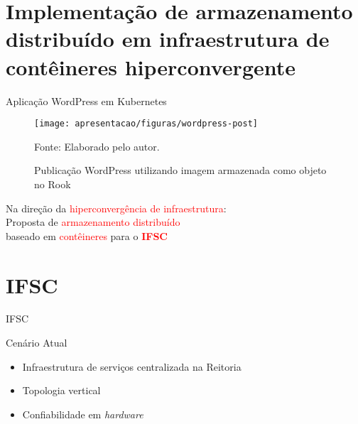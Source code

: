 \documentclass{beamer}
\begin{document}

\section{Implementação de armazenamento distribuído em infraestrutura de contêineres hiperconvergente}

\begin{frame}{Aplicação WordPress em Kubernetes}
    \begin{figure}[!htpb]
    	\centering
    	\caption{Publicação WordPress utilizando imagem armazenada como objeto no Rook}
        \texttt{[image: apresentacao/figuras/wordpress-post]}
        
    	Fonte: Elaborado pelo autor.
     	\label{wordpress_post}
    \end{figure}
\end{frame}


\begin{frame}
    \centering
    \Large{Na direção da \textcolor{red}{hiperconvergência de infraestrutura}:
    \\Proposta de \textcolor{red}{armazenamento distribuído}
    \\baseado em \textcolor{red}{contêineres} para o \textbf{\textcolor{red}{IFSC}}}
    \break
\end{frame}


\section{IFSC}

\begin{frame}{IFSC}
    \begin{block}{Cenário Atual}
        \begin{itemize}
            \item Infraestrutura de serviços centralizada na Reitoria
            \item Topologia vertical
            \item Confiabilidade em \textit{hardware}
        \end{itemize}
    \end{block}
 \end{frame}

\end{document}
